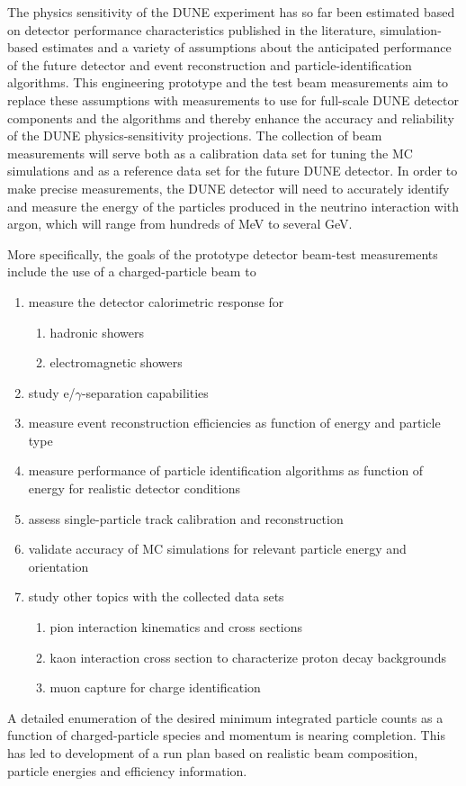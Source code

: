 The physics sensitivity of the DUNE experiment has so far been
estimated based on detector performance characteristics published in
the literature, simulation-based estimates and a variety of
assumptions about the anticipated performance of the future detector
and event reconstruction and particle-identification algorithms.  This
engineering prototype and the test beam measurements aim to replace
these assumptions with measurements to use for full-scale DUNE
detector components and the algorithms and thereby enhance the
accuracy and reliability of the DUNE physics-sensitivity projections.
The collection of beam measurements will serve both as a calibration
data set for tuning the MC simulations and as a reference data set for
the future DUNE detector.
In order to make precise measurements, the DUNE 
detector will
need to accurately identify and measure the energy of the particles
produced in the neutrino interaction with argon, which will range from
hundreds of MeV to several GeV.

More specifically, the goals of the prototype detector beam-test measurements include
the use of a charged-particle beam to
\begin{enumerate}
\item measure the detector calorimetric response for
\begin{enumerate}
	\item hadronic showers
	\item electromagnetic showers
\end{enumerate}
\item study e/$\gamma$-separation capabilities
\item measure event reconstruction efficiencies as function of energy
  and particle type
\item measure performance of particle identification algorithms as
  function of energy for realistic detector conditions
\item assess single-particle track calibration and reconstruction
\item validate accuracy of MC simulations for relevant particle energy and orientation 
\item study other topics with the collected data sets
 \begin{enumerate}
    \item pion interaction kinematics and cross sections
    \item kaon interaction cross section to characterize proton decay backgrounds
    \item muon capture for charge identification
 \end{enumerate}
\end{enumerate}
A detailed enumeration of the desired minimum integrated particle
counts as a function of charged-particle species and momentum is
nearing completion. This has led to development of a run plan based on
realistic beam composition, particle energies and efficiency
information.

